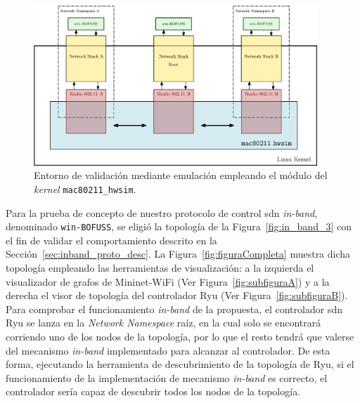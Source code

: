 \begin{figure}[ht!]
    \centering
    \includegraphics[width=0.95\textwidth]{fig/04_in-band/in_band_7.eps}
    \caption{Entorno de validación mediante emulación empleando el módulo del \textit{kernel} \texttt{mac80211\_hwsim}.} 
    \label{fig:in_band_7}
\end{figure}

Para la prueba de concepto de nuestro protocolo de control \gls{sdn} \textit{in-band}, denominado \texttt{win-BOFUSS}, se eligió la topología de la Figura~\ref{fig:in_band_3} con el fin de validar el comportamiento descrito en la Sección~\ref{sec:inband_proto_desc}. La Figura~\ref{fig:figuraCompleta} muestra dicha topología empleando las herramientas de visualización: a la izquierda el visualizador de grafos de Mininet-WiFi (Ver Figura~\ref{fig:subfiguraA}) y a la derecha el visor de topología del controlador Ryu (Ver Figura~\ref{fig:subfiguraB}). Para comprobar el funcionamiento \textit{in-band} de la propuesta, el controlador \gls{sdn} Ryu se lanza en la \textit{Network Namespace} raíz, en la cual solo se encontrará corriendo uno de los nodos de la topología, por lo que el resto tendrá que valerse del mecanismo \textit{in-band} implementado para alcanzar al controlador. De esta forma, ejecutando la herramienta de descubrimiento de la topología de Ryu, si el funcionamiento de la implementación de mecanismo \textit{in-band} es correcto, el controlador sería capaz de descubrir todos los nodos de la topología. 

